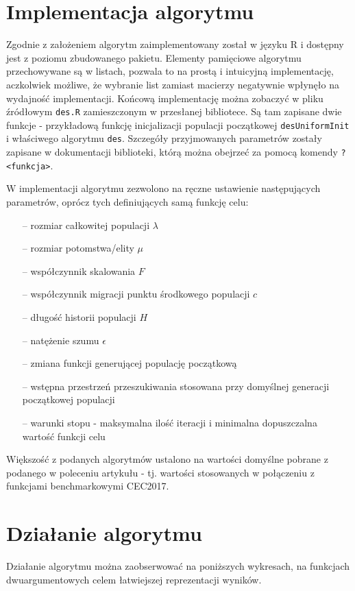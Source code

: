 \section{Implementacja algorytmu}
Zgodnie z założeniem algorytm zaimplementowany został w języku R i dostępny jest z poziomu zbudowanego pakietu. Elementy pamięciowe algorytmu przechowywane są w listach, pozwala to na prostą i intuicyjną implementację, aczkolwiek możliwe, że wybranie list zamiast macierzy negatywnie wpłynęło na wydajność implementacji. Końcową implementację można zobaczyć w pliku źródłowym \verb|des.R| zamieszczonym w przesłanej bibliotece. Są tam zapisane dwie funkcje - przykładową funkcję inicjalizacji populacji początkowej \verb|desUniformInit| i właściwego algorytmu \verb|des|. Szczegóły przyjmowanych parametrów zostały zapisane w dokumentacji biblioteki, którą można obejrzeć za pomocą komendy \verb|?<funkcja>|.

W implementacji algorytmu zezwolono na ręczne ustawienie następujących parametrów, oprócz tych definiujących samą funkcję celu:
\begin{itemize}
\item[--] rozmiar całkowitej populacji $ \lambda $
\item[--] rozmiar potomstwa/elity $\mu$
\item[--] współczynnik skalowania $F$
\item[--] współczynnik migracji punktu środkowego populacji $c$
\item[--] długość historii populacji $H$
\item[--] natężenie szumu $\epsilon$
\item[--] zmiana funkcji generującej populację początkową
\item[--] wstępna przestrzeń przeszukiwania stosowana przy domyślnej generacji początkowej populacji
\item[--] warunki stopu - maksymalna ilość iteracji i minimalna dopuszczalna wartość funkcji celu
\end{itemize}

Większość z podanych algorytmów ustalono na wartości domyślne pobrane z podanego w poleceniu artykułu - tj. wartości stosowanych w połączeniu z funkcjami benchmarkowymi CEC2017.

\section{Działanie algorytmu}
Działanie algorytmu można zaobserwować na poniższych wykresach, na funkcjach dwuargumentowych celem łatwiejszej reprezentacji wyników.

